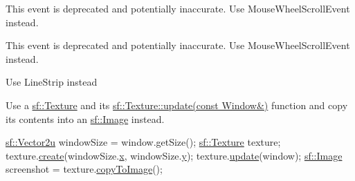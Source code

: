 
\begin{DoxyRefList}
\item[\label{deprecated__deprecated000001}%
\hypertarget{deprecated__deprecated000001}{}%
Class \hyperlink{structsf_1_1_event_1_1_mouse_wheel_event}{sf\-:\-:Event\-:\-:Mouse\-Wheel\-Event} ]This event is deprecated and potentially inaccurate. Use Mouse\-Wheel\-Scroll\-Event instead.

This event is deprecated and potentially inaccurate. Use Mouse\-Wheel\-Scroll\-Event instead. 
\item[\label{deprecated__deprecated000002}%
\hypertarget{deprecated__deprecated000002}{}%
Member \hyperlink{group__graphics_gga5ee56ac1339984909610713096283b1bafc070260a0222df367922706bbeb905a}{sf\-:\-:Lines\-Strip} ]Use Line\-Strip instead  
\item[\label{deprecated__deprecated000005}%
\hypertarget{deprecated__deprecated000005}{}%
Member \hyperlink{classsf_1_1_render_window_acd1967616b6ef482026b48f44fbf2624}{sf\-:\-:Render\-Window\-:\-:capture} () const ]Use a \hyperlink{classsf_1_1_texture}{sf\-::\-Texture} and its \hyperlink{classsf_1_1_texture_ad3cceef238f7d5d2108a98dd38c17fc5}{sf\-::\-Texture\-::update(const Window\&)} function and copy its contents into an \hyperlink{classsf_1_1_image}{sf\-::\-Image} instead. 
\begin{DoxyCode}
\hyperlink{classsf_1_1_vector2}{sf::Vector2u} windowSize = window.getSize();
\hyperlink{classsf_1_1_texture}{sf::Texture} texture;
texture.\hyperlink{classsf_1_1_texture_a89b4c7d204acf1033c3a1b6e0a3ad0a3}{create}(windowSize.\hyperlink{classsf_1_1_vector2_a1e6ad77fa155f3753bfb92699bd28141}{x}, windowSize.\hyperlink{classsf_1_1_vector2_a420f2481b015f4eb929c75f2af564299}{y});
texture.\hyperlink{classsf_1_1_texture_ae4eab5c6781316840b0c50ad08370963}{update}(window);
\hyperlink{classsf_1_1_image}{sf::Image} screenshot = texture.\hyperlink{classsf_1_1_texture_aefc19bcd95565dd2348fd4cec0facddc}{copyToImage}();
\end{DoxyCode}
 

\end{DoxyRefList}
